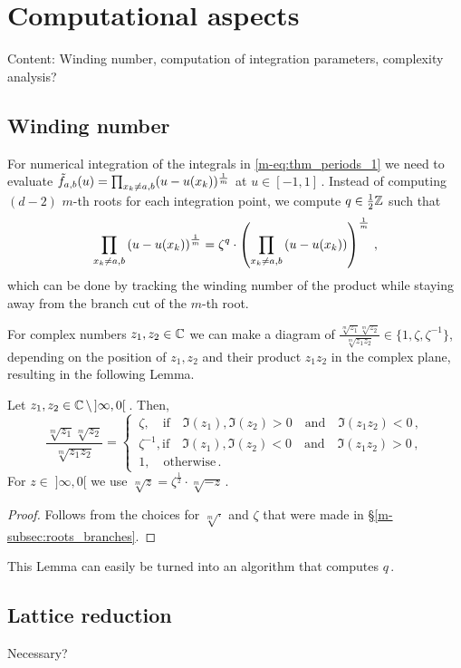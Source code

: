 \documentclass[main.tex]{subfiles}
\begin{document}
  \section{Computational aspects}

  Content: Winding number, computation of integration parameters, complexity analysis?

  \subsection{Winding number}
      
      For numerical integration of the integrals in \eqref{m-eq:thm_periods_1} we need to evaluate $\tilde{f}_{a,b}(u) = \prod_{x_k \ne a,b} (u-u(x_k))^{\frac{1}{m}}$ at $u \in [-1,1]$\,. 
      Instead of computing $(d-2)$ $m$-th roots for each integration point, we compute $q \in \frac{1}{2}\mathbb{Z}$ such that
      $$\prod_{x_k \ne a,b} \left(u - u(x_k) \right)^{\frac{1}{m}} = \zeta^q \cdot \left( \prod_{x_k \ne a,b} \left( u - u(x_k) \right) \right)^{\frac{1}{m}} \,,$$
      which can be done by tracking the winding number of the product while staying away from the branch cut of the $m$-th root.
      
      For complex numbers $z_1,z_2 \in \mathbb{C}$ we can make a diagram of $\frac{\sqrt[m]{z_1}\sqrt[m]{z_2}}{\sqrt[m]{z_1z_2}} \in \{ 1, \zeta, \zeta^{-1} \}$, depending on the position of
      $z_1,z_2$ and their product $z_1z_2$ in the complex plane, resulting in the following Lemma.
      
     \begin{lemma}\label{lemma:wind_numb}
     Let $z_1,z_2 \in \mathbb{C} \, \setminus \, ]\infty,0[$\,. Then,
     $$\frac{\sqrt[m]{z_1}\sqrt[m]{z_2}}{\sqrt[m]{z_1z_2}} = \begin{cases}
                                                             \, \zeta, \quad \text{if} \quad \Im(z_1), \Im(z_2) > 0 \quad \text{and} \quad \Im(z_1z_2) < 0 \,, \\
                                                             \, \zeta^{-1}, \text{if} \quad \Im(z_1), \Im(z_2) < 0 \quad \text{and} \quad \Im(z_1z_2) > 0 \,, \\
                                                             \, 1, \quad \text{otherwise}\,.
                                                            \end{cases}$$
      For $z \in \;]\infty,0[$ we use $\sqrt[m]{z} = \zeta^{\frac{1}{2}} \cdot \sqrt[m]{-z}$\,.
     \end{lemma}
     \begin{proof}
      Follows from the choices for $\sqrt[m]{\cdot}$ and $\zeta$ that were made in \S \ref{m-subsec:roots_branches}.
     \end{proof}
      This Lemma can easily be turned into an algorithm that computes $q$\,.
 
 
      \subsection{Lattice reduction}
  
    Necessary?
 
 \biblio
\end{document}
